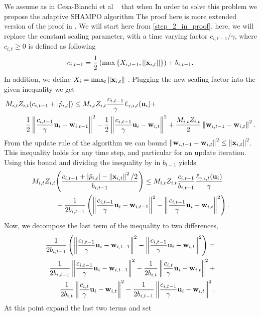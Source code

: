 We assume as in Cesa-Bianchi et al  ~\cite{cesa2006worst} that when  In order to solve this problem we propose the adaptive SHAMPO algorithm 
The proof here is more  extended version of the proof in  . We will start here from \eqref{step_2_in_proof}. here, we will replace the constant scaling parameter, with a time varying factor $c_{i,t-1}/\gamma$, where $c_{i,t}\ge0$  is defined as following 
\begin{equation*}
c_{i,t-1}=\frac{1}{2}\left({\max{\left\{{X_{i,t-1},\left\vert{\left\vert{\mathbf{x}_{i,t}}\right\vert}\right\vert}\right\}}}\right)+b_{i,t-1}.
\end{equation*}
In addition, we define $X_i=\max_t{\Vert\mathbf{x}_{i,t}\Vert}$ . Plugging the new scaling factor into the given inequality we get 
\begin{equation*}
\begin{split}
M_{i,t}Z_{i,t}{\left({c_{i,t-1} +\left\vert{\hat{p}_{i,t}}\right\vert}\right)} \le M_{i,t}&Z_{i,t}\frac{c_{i,t-1}}{\gamma} \ell_{\gamma,i,t}(\mathbf{u}_i)+\\ 
\frac{1}{2}\left\Vert {\frac{c_{i,t-1}}{\gamma} \mathbf{u}_i-\mathbf{w}_{i,t-1}} \right\Vert^2&-\frac{1}{2}\left\Vert {\frac{c_{i,t-1}}{\gamma} \mathbf{u}_i-\mathbf{w}_{i,t}} \right\Vert^2+
\frac{M_{i,t}Z_{i,t}}{2}\left\Vert {\mathbf{w}_{i,t-1}-\mathbf{w}_{i,t}} \right\Vert^2.
\end{split}
\end{equation*}
 From the update rule of the  algorithm we can bound $\left\Vert {\mathbf{w}_{i,t-1}-\mathbf{w}_{i,t}} \right\Vert^2\le \left\Vert {\mathbf{x}_{i,t}} \right\Vert^2$. This inequality holds for any time step, and particular for an update iteration. Using this bound and dividing the inequality by in  $b_{t-1}$ yields
\begin{equation}
\begin{split}
M_{i,t}Z_{i,t}&{\left({\frac{c_{i,t-1} +\left\vert{\hat{p}_{i,t}}\right\vert-\left\Vert {\mathbf{x}_{i,t}} \right\Vert^2/2}{b_{i,t-1}}}\right)} \le M_{i,t}Z_{i,t}\frac{c_{i,t-1}}{b_{i,t-1}}\frac{\ell_{\gamma,i,t}(\mathbf{u}_i)}{\gamma} \\ 
&+\frac{1}{2b_{i,t-1
}}\left({\left\Vert {\frac{c_{i,t-1}}{\gamma} \mathbf{u}_i-\mathbf{w}_{i,t-1}} \right\Vert^2-\left\Vert {\frac{c_{i,t-1}}{\gamma} \mathbf{u}_i-\mathbf{w}_{i,t}} \right\Vert^2}\right).
\label{eq:adaptive_b_first_step}
\end{split}
\end{equation}
Now, we decompose the last term of the inequality to two  differences,
\begin{equation*}
\begin{split}
\frac{1}{2b_{i,t-1}}
\left({\left\Vert {\frac{c_{i,t-1}}{\gamma} \mathbf{u}_i-\mathbf{w}_{i,t-1}} \right\Vert^2-\left\Vert {\frac{c_{i,t-1}}{\gamma} \mathbf{u}_i-\mathbf{w}_{i,t}} \right\Vert^2}\right)= \\
\frac{1}{2b_{i,t-1}}\left\Vert {\frac{c_{i,t-1}}{\gamma} \mathbf{u}_i-\mathbf{w}_{i,t-1}} \right\Vert^2-\frac{1}{2b_{i,t}}\left\Vert {\frac{c_{i,t}}{\gamma} \mathbf{u}_i-\mathbf{w}_{i,t}} \right\Vert^2+\\
\frac{1}{2b_{i,t}}\left\Vert {\frac{c_{i,t}}{\gamma} \mathbf{u}_i-\mathbf{w}_{i,t}} \right\Vert^2-\frac{1}{2b_{i,t-1}}\left\Vert {\frac{c_{i,t-1}}{\gamma} \mathbf{u}_i-\mathbf{w}_{i,t}} \right\Vert^2.
\end{split}
\end{equation*}
At this point  expand the last two terms and  set   

